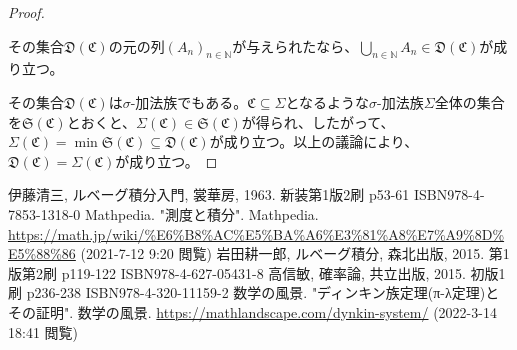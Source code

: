 \documentclass[dvipdfmx]{jsarticle}
\begin{document}
\begin{proof}
\begin{itemize}
  その集合$\mathfrak{D}\left( \mathfrak{C} \right)$の元の列$\left( A_{n} \right)_{n \in \mathbb{N}}$が与えられたなら、$\bigcup_{n \in \mathbb{N}} A_{n}\in \mathfrak{D}\left( \mathfrak{C} \right)$が成り立つ。
\end{itemize}
その集合$\mathfrak{D}\left( \mathfrak{C} \right)$は$\sigma$-加法族でもある。$\mathfrak{C}\subseteq \varSigma$となるような$\sigma$-加法族$\varSigma$全体の集合を$\mathfrak{S}\left( \mathfrak{C} \right)$とおくと、$\varSigma\left( \mathfrak{C} \right)\in \mathfrak{S}\left( \mathfrak{C} \right)$が得られ、したがって、$\varSigma\left( \mathfrak{C} \right) = \min{\mathfrak{S}\left( \mathfrak{C} \right)}\subseteq \mathfrak{D}\left( \mathfrak{C} \right)$が成り立つ。以上の議論により、$\mathfrak{D}\left( \mathfrak{C} \right) = \varSigma\left( \mathfrak{C} \right)$が成り立つ。
\end{proof}
\begin{thebibliography}{50}
  伊藤清三, ルベーグ積分入門, 裳華房, 1963. 新装第1版2刷 p53-61 ISBN978-4-7853-1318-0
  Mathpedia. "測度と積分". Mathpedia. \url{https://math.jp/wiki/%E6%B8%AC%E5%BA%A6%E3%81%A8%E7%A9%8D%E5%88%86} (2021-7-12 9:20 閲覧)
  岩田耕一郎, ルベーグ積分, 森北出版, 2015. 第1版第2刷 p119-122 ISBN978-4-627-05431-8
  高信敏, 確率論, 共立出版, 2015. 初版1刷 p236-238 ISBN978-4-320-11159-2
  数学の風景. "ディンキン族定理(π-λ定理)とその証明". 数学の風景. \url{https://mathlandscape.com/dynkin-system/} (2022-3-14 18:41 閲覧)
\end{thebibliography}
\end{document}
